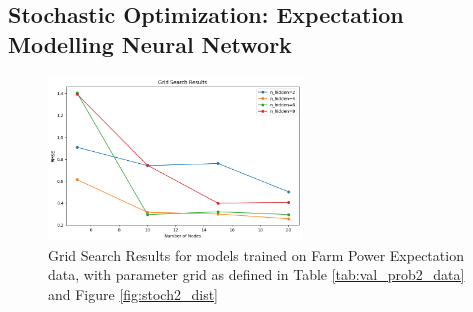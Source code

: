 \documentclass[preprint,12pt]{elsarticle}
\begin{document}
\subsection{Stochastic Optimization:  Expectation Modelling Neural Network}


\begin{figure}[h] 
	\centering
	\includegraphics[width=0.6\textwidth]{../figures/optimization/stoch2/stoch2_NNopti.png} 
	\caption{Grid Search Results for models trained on Farm Power Expectation data, with parameter grid as defined in Table 	\ref{tab:val_prob2_data} and Figure  \ref{fig:stoch2_dist} }
	\label{fig:stoch2_NNopti}
\end{figure} 
\end{document}
